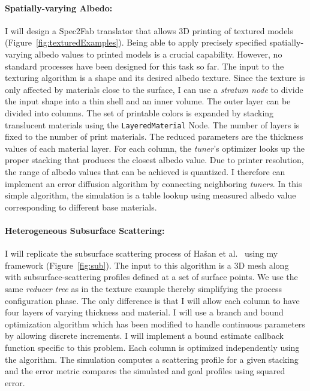 \paragraph{Spatially-varying Albedo:}
I will design a Spec2Fab translator that allows 3D printing of textured models (Figure~\ref{fig:texturedExamples}).
Being able to apply precisely specified spatially-varying albedo values to printed models is a crucial capability.
However, no standard processes have been designed for this task so far.
The input to the texturing algorithm is a shape and its desired albedo texture.
Since the texture is only affected by materials close to the surface, I can use a \emph{stratum node} to divide the input shape into a thin shell and an inner volume.
The outer layer can be divided into columns.
The set of printable colors is expanded by stacking translucent materials using the \verb|LayeredMaterial| Node.
The number of layers is fixed to the number of print materials.
The reduced parameters are the thickness values of each material layer.
For each column, the \emph{tuner}'s optimizer looks up the proper stacking that produces the closest albedo value.
Due to printer resolution, the range of albedo values that can be achieved is quantized.
I therefore can implement an error diffusion algorithm by connecting neighboring \emph{tuners}.
In this simple algorithm, the simulation is a table lookup using measured albedo value corresponding to different base materials.


\paragraph{Heterogeneous Subsurface Scattering:}
I will replicate the subsurface scattering process of Ha\v{s}an et al.~ using my framework (Figure~\ref{fig:sub}).
The input to this algorithm is a 3D mesh along with subsurface-scattering profiles defined at a set of surface points. We use the same \emph{reducer tree} as in the texture example thereby simplifying the process configuration phase.
The only difference is that I will allow each column to have four layers of varying thickness and material. 
I will use a branch and bound optimization algorithm which has been modified to handle continuous parameters by allowing discrete increments.
I will implement a bound estimate callback function specific to this problem.
Each column is optimized independently using the algorithm. 
The simulation computes a scattering profile for a given stacking and the error metric compares the simulated and goal profiles using squared error.

